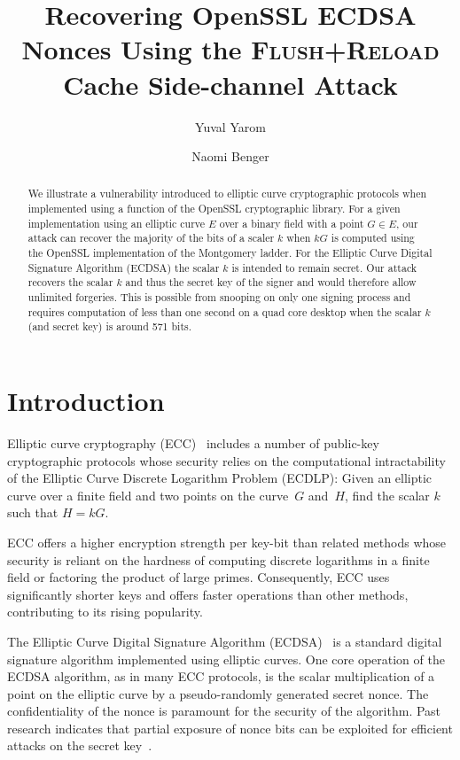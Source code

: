 \documentclass[twocolumn]{svjour3}
\begin{document}
\title{Recovering OpenSSL ECDSA Nonces Using the \textsc{Flush+Reload} Cache Side-channel Attack}
\author{Yuval Yarom \and Naomi Benger}

\maketitle

\begin{abstract}
We illustrate a vulnerability introduced to elliptic curve cryptographic protocols when implemented using a function of the OpenSSL cryptographic library.
For a given implementation using an elliptic curve $E$ over a binary field with a point $G\in E$, our attack can recover the majority of the bits of a scaler $k$ when $kG$ is computed using the OpenSSL implementation of the Montgomery ladder. 
For the Elliptic Curve Digital Signature Algorithm (ECDSA) the scalar $k$ is intended to remain secret. 
Our attack recovers the scalar $k$ and thus the secret key of the signer and would therefore allow unlimited forgeries. 
This is possible from snooping on only one signing process and requires computation of less than one second on a quad core desktop when the scalar $k$ (and secret key) is around 571 bits.

\end{abstract}

\section{Introduction}
Elliptic curve cryptography (ECC)~\cite{miller85use,koblitz87elliptic} includes a number of public-key cryptographic protocols whose security relies on the computational intractability of the Elliptic Curve Discrete Logarithm Problem (ECDLP): Given an elliptic curve over a finite field and two points on the curve~$G$ and~$H$, find the scalar $k$ such that $H=kG$.

ECC offers a higher encryption strength per key-bit than related methods whose security is reliant on the hardness of computing discrete logarithms in a finite field or factoring the product of large primes. Consequently, ECC uses significantly shorter keys and offers faster operations than other methods, contributing to its rising popularity.

The Elliptic Curve Digital Signature Algorithm (ECDSA)~\cite{johnson01elliptic,fips,ansi962} is a standard
digital signature algorithm implemented using elliptic curves. One core operation of the ECDSA algorithm, as in many ECC protocols, is the scalar multiplication of a point on the elliptic curve by a pseudo-randomly generated secret nonce. The confidentiality of the nonce is paramount for the security of the algorithm. Past research indicates that partial exposure of nonce bits can be exploited for efficient attacks on the secret key~\cite{nguyen03insecurity,brumley11remote}.
\end{document}
